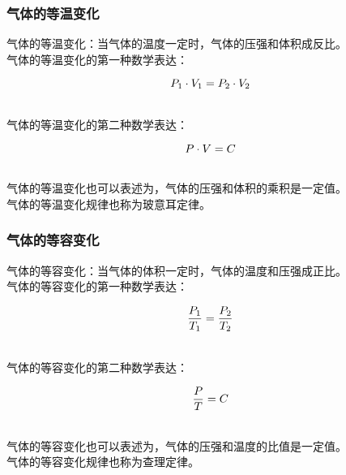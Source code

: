 \documentclass[UTF8]{ctexart}
\begin{document}
\newpage

\subsubsection{气体的等温变化}
    气体的等温变化：当气体的温度一定时，气体的压强和体积成反比。\\[3mm]
    气体的等温变化的第一种数学表达：
    \begin{large}
        \begin{equation*}
            P_1\cdot V_1=P_2\cdot V_2\vspace{-8pt}
        \end{equation*}
    \end{large}\\
    气体的等温变化的第二种数学表达：
    \begin{large}
        \begin{equation*}
            P\cdot V=C\vspace{-6pt}
        \end{equation*}
    \end{large}\\
    气体的等温变化也可以表述为，气体的压强和体积的乘积是一定值。\\[3mm]
    气体的等温变化规律也称为玻意耳定律。\vspace{7pt}

\subsubsection{气体的等容变化}
    气体的等容变化：当气体的体积一定时，气体的温度和压强成正比。\\[3mm]
    气体的等容变化的第一种数学表达：
    \begin{large}
        \begin{equation*}
            \frac{P_1}{T_1}=\frac{P_2}{T_2}\vspace{-3pt}
        \end{equation*}
    \end{large}\\
    气体的等容变化的第二种数学表达：
    \begin{large}
        \begin{equation*}
            \frac{P}{T}=C\vspace{-3pt}
        \end{equation*}
    \end{large}\\
    气体的等容变化也可以表述为，气体的压强和温度的比值是一定值。\\[3mm]
    气体的等容变化规律也称为查理定律。\vspace{7pt}
\end{document}

